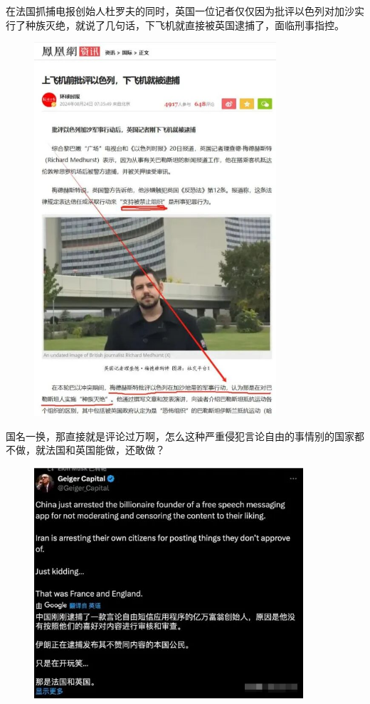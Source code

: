 \documentclass[UTF8,11pt,oneside]{ctexart}
\begin{document}


在法国抓捕电报创始人杜罗夫的同时，英国一位记者仅仅因为批评以色列对加沙实行了种族灭绝，就说了几句话，下飞机就直接被英国逮捕了，面临刑事指控。

\begin{figure}[H]
    \centering
    \includegraphics[width=9cm]{2024-08-28-005.jpg}
\end{figure}

国名一换，那直接就是评论过万啊，怎么这种严重侵犯言论自由的事情别的国家都不做，就法国和英国能做，还敢做？

\begin{figure}[H]
    \centering
    \includegraphics[width=10cm]{2024-08-28-006.jpg}
\end{figure}
\end{document}
